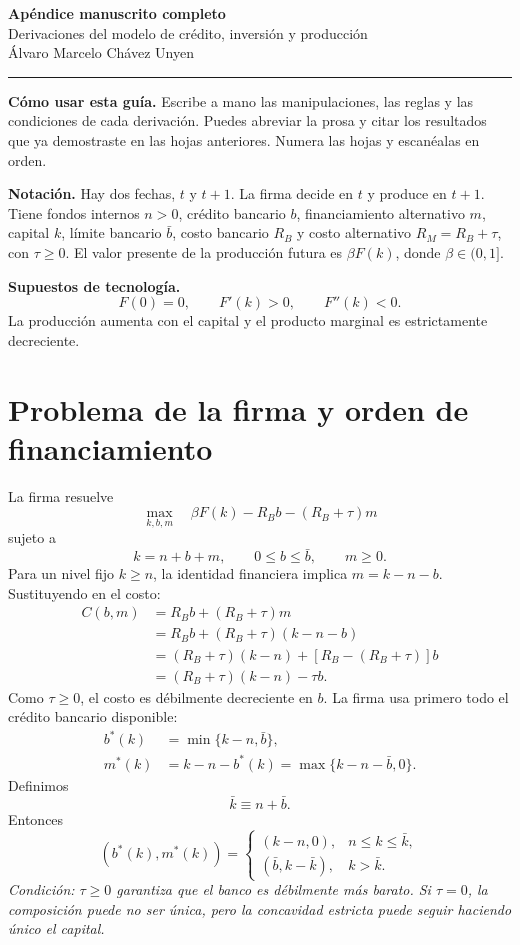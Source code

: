 \documentclass[11pt]{article}
\newcommand{\Rb}{R_B}
\newcommand{\Rm}{R_M}
\newcommand{\cond}[1]{\textcolor{guideblue}{\textit{Condición: #1}}}
\begin{document}
\begin{center}
{\LARGE\bfseries Apéndice manuscrito completo}\\[4pt]
{\large Derivaciones del modelo de crédito, inversión y producción}\\[7pt]
Álvaro Marcelo Chávez Unyen
\end{center}
\hrule
\vspace{8pt}

\textbf{Cómo usar esta guía.} Escribe a mano las manipulaciones, las reglas
y las condiciones de cada derivación. Puedes abreviar la prosa y citar los
resultados que ya demostraste en las hojas anteriores. Numera las hojas y
escanéalas en orden.

\textbf{Notación.} Hay dos fechas, $t$ y $t+1$. La firma decide en $t$ y produce
en $t+1$. Tiene fondos internos $n>0$, crédito bancario $b$, financiamiento
alternativo $m$, capital $k$, límite bancario $\bar b$, costo bancario $\Rb$ y
costo alternativo $\Rm=\Rb+\tau$, con $\tau\geq0$. El valor presente de la
producción futura es $\beta F(k)$, donde $\beta\in(0,1]$.

\textbf{Supuestos de tecnología.}
\[
F(0)=0,\qquad F'(k)>0,\qquad F''(k)<0.
\]
La producción aumenta con el capital y el producto marginal es estrictamente
decreciente.

\newpage
\section{Problema de la firma y orden de financiamiento}

La firma resuelve
\[
\max_{k,b,m}\quad \beta F(k)-\Rb b-(\Rb+\tau)m
\]
sujeto a
\[
k=n+b+m,\qquad 0\leq b\leq\bar b,\qquad m\geq0.
\]
Para un nivel fijo $k\geq n$, la identidad financiera implica $m=k-n-b$.
Sustituyendo en el costo:
\begin{align*}
C(b,m)
&=\Rb b+(\Rb+\tau)m\\
&=\Rb b+(\Rb+\tau)(k-n-b)\\
&=(\Rb+\tau)(k-n)+[\Rb-(\Rb+\tau)]b\\
&=(\Rb+\tau)(k-n)-\tau b.
\end{align*}
Como $\tau\geq0$, el costo es débilmente decreciente en $b$. La firma usa
primero todo el crédito bancario disponible:
\begin{align*}
b^*(k)&=\min\{k-n,\bar b\},\\
m^*(k)&=k-n-b^*(k)=\max\{k-n-\bar b,0\}.
\end{align*}
Definimos
\[
\boxed{\bar k\equiv n+\bar b.}
\]
Entonces
\[
(b^*(k),m^*(k))=
\begin{cases}
(k-n,0),&n\leq k\leq\bar k,\\
(\bar b,k-\bar k),&k>\bar k.
\end{cases}
\]
\cond{$\tau\geq0$ garantiza que el banco es débilmente más barato. Si
$\tau=0$, la composición puede no ser única, pero la concavidad estricta puede
seguir haciendo único el capital.}
\end{document}
